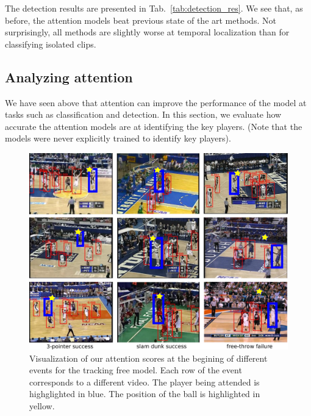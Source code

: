  The detection results
are presented in Tab.~\ref{tab:detection_res}.
We see that, as before, the attention models beat previous state of
the art methods.
Not surprisingly, all methods are slightly worse at temporal
localization
than for classifying
isolated clips.

\subsection{Analyzing attention}

We have seen above that attention can improve the performance of the
model at tasks such as classification and detection. 
In this section, we evaluate how accurate the attention models are at
identifying the key players. (Note that the models were never
explicitly trained to identify key players).



\begin{figure}[t!]
\begin{center}
   \includegraphics[width=1.0\linewidth]{images/visual_examples_v2.pdf}
\end{center}
   \caption{Visualization of our attention scores at the begining of different events
     for the tracking free model.
Each row of the event corresponds to a different video.
The player being attended is highglighted in blue.
The position of the ball is highlighted in yellow.}
\label{fig:visual_attention}
\end{figure}



